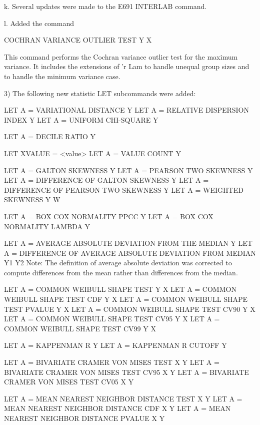     k. Several updates were made to the E691 INTERLAB command.

    l. Added the command

           COCHRAN VARIANCE OUTLIER TEST Y X

       This command performs the Cochran variance outlier test for the
       maximum variance.  It includes the extensions of 'r Lam to handle
       unequal group sizes and to handle the minimum variance case.

 3) The following new statistic LET subcommands were added:

          LET A = VARIATIONAL DISTANCE Y
          LET A = RELATIVE DISPERSION INDEX Y
          LET A = UNIFORM CHI-SQUARE Y

          LET A = DECILE RATIO Y

          LET XVALUE = <value>
          LET A = VALUE COUNT Y

          LET A = GALTON SKEWNESS Y
          LET A = PEARSON TWO SKEWNESS Y
          LET A = DIFFERENCE OF GALTON SKEWNESS Y
          LET A = DIFFERENCE OF PEARSON TWO SKEWNESS Y
          LET A = WEIGHTED SKEWNESS Y W

          LET A = BOX COX NORMALITY PPCC Y
          LET A = BOX COX NORMALITY LAMBDA Y

          LET A = AVERAGE ABSOLUTE DEVIATION FROM THE MEDIAN Y
          LET A = DIFFERENCE OF AVERAGE ABSOLUTE DEVIATION FROM MEDIAN Y1 Y2
                  Note: The definition of average absolute deviation
                        was corrected to compute differences from the
                        mean rather than differences from the median.

          LET A = COMMON WEIBULL SHAPE TEST Y X
          LET A = COMMON WEIBULL SHAPE TEST CDF Y X
          LET A = COMMON WEIBULL SHAPE TEST PVALUE Y X
          LET A = COMMON WEIBULL SHAPE TEST CV90 Y X
          LET A = COMMON WEIBULL SHAPE TEST CV95 Y X
          LET A = COMMON WEIBULL SHAPE TEST CV99 Y X

          LET A = KAPPENMAN R Y
          LET A = KAPPENMAN R CUTOFF  Y

          LET A = BIVARIATE CRAMER VON MISES TEST X Y
          LET A = BIVARIATE CRAMER VON MISES TEST CV95 X Y
          LET A = BIVARIATE CRAMER VON MISES TEST CV05 X Y

          LET A = MEAN NEAREST NEIGHBOR DISTANCE TEST X Y
          LET A = MEAN NEAREST NEIGHBOR DISTANCE CDF X Y
          LET A = MEAN NEAREST NEIGHBOR DISTANCE PVALUE X Y
          
